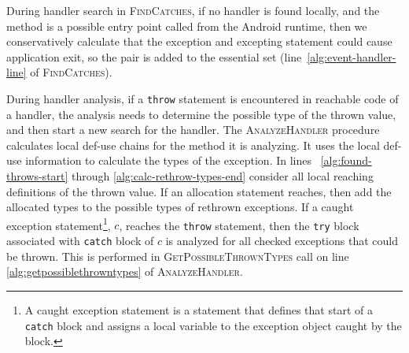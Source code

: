 During handler search in \textsc{FindCatches}, if no handler is found
locally, and the method is a possible entry point called from the
Android runtime, then we conservatively calculate that the exception
and excepting statement could cause application exit, so the pair is
added to the essential set (line~\ref{alg:event-handler-line} of
\textsc{FindCatches}). 

During handler analysis, if a \lstinline!throw! statement is
encountered in reachable code of a handler, the analysis needs to
determine the possible type of the thrown value, and then start a new
search for the handler.  The \textsc{AnalyzeHandler} procedure
calculates local def-use chains for the method it is analyzing.  It
uses the local def-use information to calculate the types of the
exception.  In lines ~\ref{alg:found-throws-start} through
\ref{alg:calc-rethrow-types-end} consider all local reaching
definitions of the thrown value.  If an allocation statement reaches,
then add the allocated types to the possible types of rethrown
exceptions. If a caught exception statement\footnote{A caught
  exception statement is a statement that defines that start of a
  \lstinline!catch! block and assigns a local variable to the
  exception object caught by the block.}, $c$, reaches the
\lstinline!throw! statement, then the 
\lstinline!try! block associated with \lstinline!catch! block of
$c$ is analyzed for all checked exceptions that could be thrown.  This
is performed in \textsc{GetPossibleThrownTypes} call on 
line \ref{alg:getpossiblethrowntypes} of \textsc{AnalyzeHandler}.

